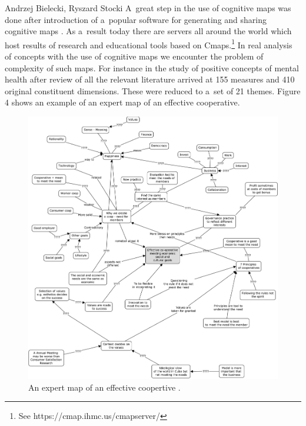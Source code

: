\begin{artengenv2auth}{Andrzej Bielecki, Ryszard Stocki}
A~great step in the use of cognitive maps was done after introduction of a~popular software for generating and sharing cognitive maps 
\parencite[][]{novak_origins_2006}. %
 As a~result today there are servers all around the world which host results of research and educational tools based on Cmaps.\footnote{See https://cmap.ihmc.us/cmapserver/ } In real analysis of concepts with the use of cognitive maps we encounter the problem of complexity of such maps. For instance in the study of positive concepts of mental health 
\parencite[][]{iasiello_whats_2023} %
 after review of all the relevant literature arrived at 155 measures and 410 original constituent dimensions. These were reduced to a~set of 21 themes. Figure 4 shows an example of an expert map of an effective cooperative.



\begin{figure}
 \begin{center}
 \begin{adjustwidth}{-.1\textwidth}{}
 \includegraphics[width=1.2\textwidth]{ART_Bielecki/fig6.pdf}%
 \end{adjustwidth}
 \end{center}%
 \caption{An expert map of an effective coopertive 
 \parencite[][]{stocki_tacit_nodate}.}\label{bie:fig4}
\end{figure}





\end{artengenv2auth}
